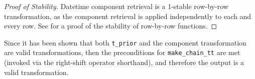 \documentclass{article}
\begin{document}
\begin{proof}[Proof of Stability]
    Datetime component retrieval is a 1-stable row-by-row transformation, 
    as the component retrieval is applied independently to each and every row.
    See  for a proof of the stability of row-by-row functions.
\end{proof}

Since it has been shown that both \texttt{t\_prior} and the component transformation are valid transformations,
then the preconditions for \texttt{make\_chain\_tt} are met (invoked via the right-shift operator shorthand),
and therefore the output is a valid transformation.
\end{document}
